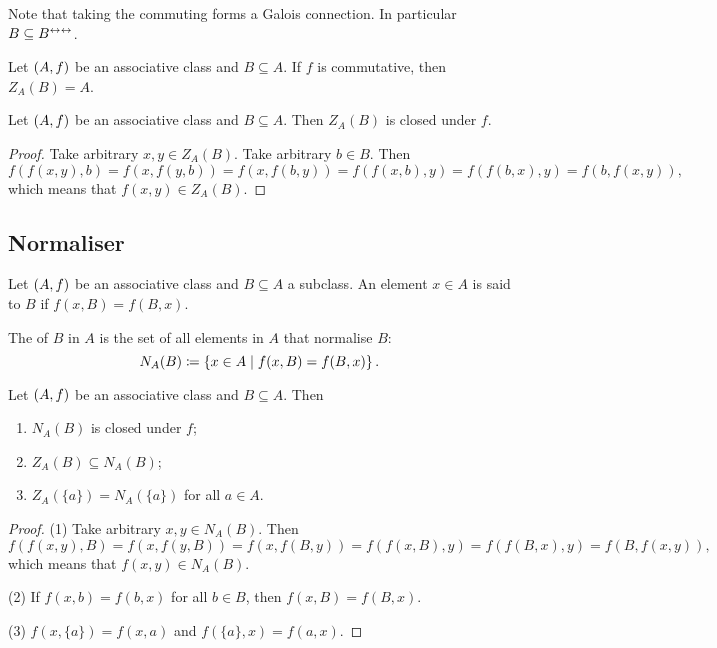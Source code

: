 Note that taking the commuting forms a Galois connection. In particular $B \subseteq B^{\leftrightarrow\leftrightarrow}$.

\begin{lemma}
Let $\left( A,f \right)$ be an associative class and $B\subseteq A$. If $f$ is commutative, then $Z_A(B) = A$.
\end{lemma}

\begin{proposition}
Let $\left( A,f \right)$ be an associative class and $B\subseteq A$. Then $Z_A(B)$ is closed under $f$.
\end{proposition}
\begin{proof}
Take arbitrary $x,y\in Z_A(B)$. Take arbitrary $b\in B$. Then
\[ f(f(x,y),b) = f(x,f(y,b)) = f(x,f(b,y)) = f(f(x,b),y) = f(f(b,x),y) = f(b,f(x,y)), \]
which means that $f(x,y)\in Z_A(B)$.
\end{proof}

\subsection{Normaliser}
\begin{definition}
Let $\left( A,f \right)$ be an associative class and $B\subseteq A$ a subclass. An element $x\in A$ is said to  $B$ if $f(x,B) = f(B,x)$.

The  of $B$ in $A$ is the set of all elements in $A$ that normalise $B$:
\[ N_A(B) \coloneqq \left\{ x\in A \;\middle|\; f(x,B) = f(B,x) \right\}. \]
\end{definition}

\begin{proposition}
Let $\left( A,f \right)$ be an associative class and $B\subseteq A$. Then
\begin{enumerate}
\item $N_A(B)$ is closed under $f$;
\item $Z_A(B) \subseteq N_A(B)$;
\item $Z_A(\{a\}) = N_A(\{a\})$ for all $a\in A$.
\end{enumerate}
\end{proposition}
\begin{proof}
(1) Take arbitrary $x,y\in N_A(B)$. Then
\[ f(f(x,y),B) = f(x,f(y,B)) = f(x,f(B,y)) = f(f(x,B),y) = f(f(B,x),y) = f(B,f(x,y)), \]
which means that $f(x,y)\in N_A(B)$.

(2) If $f(x,b) = f(b,x)$ for all $b\in B$, then $f(x,B) = f(B,x)$.

(3) $f(x,\{a\}) = f(x,a)$ and $f(\{a\}, x) = f(a,x)$.
\end{proof}



